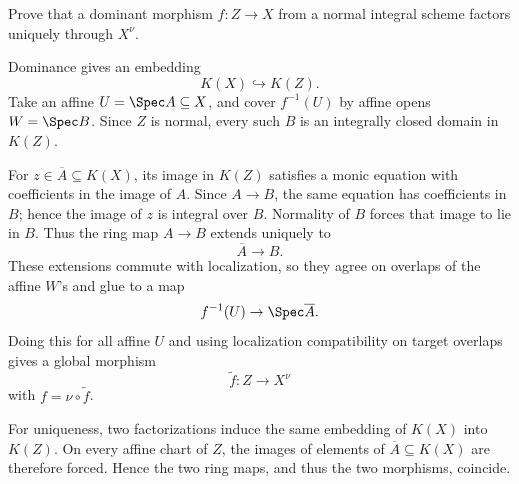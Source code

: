 \begin{problem}\label{prob:vi28-03}
Prove that a dominant morphism \(f:Z\to X\) from a normal integral scheme factors uniquely through \(X^\nu\).

\end{problem}

\ifdefined\FullProblemDossiers
\begin{solution}
Dominance gives an embedding
\[
K(X)\hookrightarrow K(Z).
\]
Take an affine \(U=\Spec A\subseteq X\), and cover \(f^{-1}(U)\) by affine opens
\(W=\Spec B\). Since \(Z\) is normal, every such \(B\) is an integrally closed domain in \(K(Z)\).

For \(z\in\overline A\subseteq K(X)\), its image in \(K(Z)\) satisfies a monic equation with coefficients in the image of \(A\). Since \(A\to B\), the same equation has coefficients in \(B\); hence the image of \(z\) is integral over \(B\). Normality of \(B\) forces that image to lie in \(B\). Thus the ring map \(A\to B\) extends uniquely to
\[
\overline A\to B.
\]
These extensions commute with localization, so they agree on overlaps of the affine \(W\)'s and glue to a map
\[
f^{-1}(U)\to\Spec\overline A.
\]
Doing this for all affine \(U\) and using localization compatibility on target overlaps gives a global morphism
\[
\widetilde f:Z\to X^\nu
\]
with \(f=\nu\circ\widetilde f\).

For uniqueness, two factorizations induce the same embedding of \(K(X)\) into \(K(Z)\). On every affine chart of \(Z\), the images of elements of \(\overline A\subseteq K(X)\) are therefore forced. Hence the two ring maps, and thus the two morphisms, coincide.
\end{solution}
\fi
